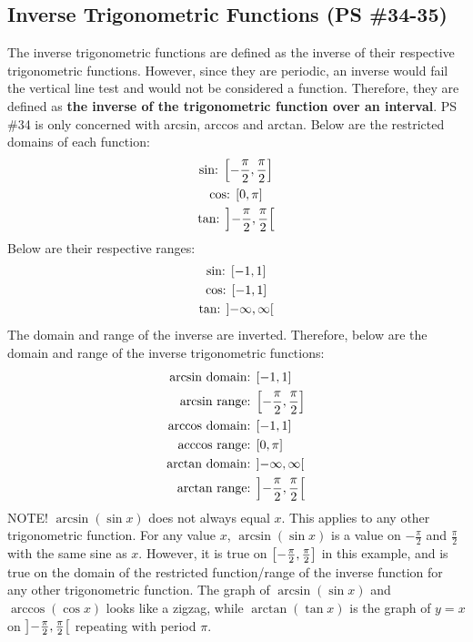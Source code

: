 \documentclass{article}
\begin{document}
\subsection{Inverse Trigonometric Functions (PS \#34-35)}
The inverse trigonometric functions are defined as the inverse
of their respective trigonometric functions. However, since they
are periodic, an inverse would fail the vertical line test and
would not be considered a function. Therefore, they are defined as 
\textbf{the inverse of the trigonometric function over an interval}.
PS \#34 is only concerned with arcsin, arccos and arctan. Below
are the restricted domains of each function:
\begin{gather*}
	\text{sin: }\interval[scaled]{-\frac{\pi}{2}}{\frac{\pi}{2}} \\
	\text{cos: }\interval[scaled]{0}{\pi} \\
	\text{tan: }\interval[scaled,open left,open right]
		{-\frac{\pi}{2}}{\frac{\pi}{2}}
\end{gather*}
Below are their respective ranges:
\begin{gather*}
	\text{sin: }\interval[scaled]{-1}{1} \\
	\text{cos: }\interval[scaled]{-1}{1} \\
	\text{tan: }\interval[scaled,open left,open right]
		{-\infty}{\infty}
\end{gather*}
The domain and range of the inverse are inverted. Therefore, below
are the domain and range of the inverse trigonometric functions:
\begin{align*}
	\text{arcsin domain: }&\interval[scaled]{-1}{1} \\
	\text{arcsin range: }&\interval[scaled]{-\frac{\pi}{2}}
		{\frac{\pi}{2}} \\
	\text{arccos domain: }&\interval[scaled]{-1}{1} \\
	\text{acccos range: }&\interval[scaled]{0}{\pi} \\
	\text{arctan domain: }&\interval[scaled,open left,open right]
		{-\infty}{\infty} \\
	\text{arctan range: }&\interval[scaled,open left,open right]
		{-\frac{\pi}{2}}{\frac{\pi}{2}}
\end{align*}
NOTE! $\arcsin\left(\sin x\right)$ does not always equal $x$. This
applies to any other trigonometric function. For any value $x$,
$\arcsin\left(\sin x\right)$ is a value on $-\frac{\pi}{2}$ and
$\frac{\pi}{2}$ with the same sine as $x$. However, it is true on
$\interval[scaled]{-\frac{\pi}{2}}{\frac{\pi}{2}}$ in this example,
and is true on the domain of the restricted function/range of the
inverse function for any other trigonometric function. The graph
of $\arcsin\left(\sin x\right)$ and $\arccos\left(\cos x\right)$
looks like a zigzag, while $\arctan\left(\tan x\right)$ is the
graph of $y=x$ on $\interval[scaled,open left,open right]{-\frac
{\pi}{2}}{\frac{\pi}{2}}$ repeating with period $\pi$.
\end{document}
